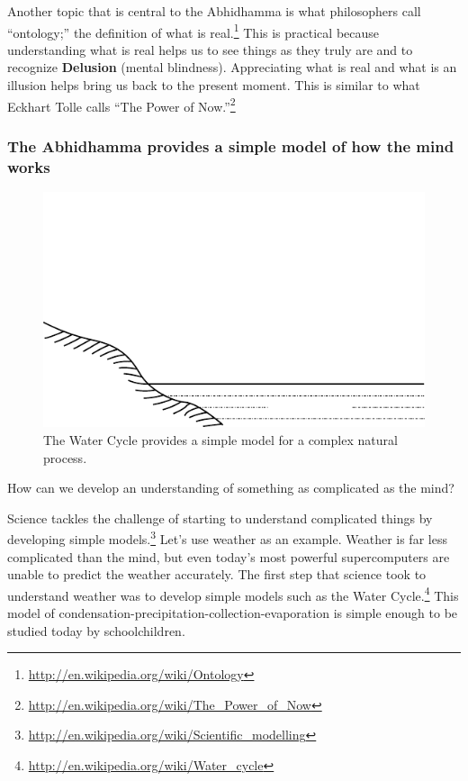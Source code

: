 Another topic that is central to the Abhidhamma is what philosophers call “ontology;” the definition of what is real.\footnote{\url{http://en.wikipedia.org/wiki/Ontology}} This is practical because understanding what is real helps us to see things as they truly are and to recognize \textbf{Delusion} (mental blindness). Appreciating what is real and what is an illusion helps bring us back to the present moment. This is similar to what Eckhart Tolle calls “The Power of Now.”\footnote{\url{http://en.wikipedia.org/wiki/The_Power_of_Now}}

\subsubsection*{The Abhidhamma provides a simple model of how the mind works}

\begin{figure}[H]
\centering
\includegraphics[width=1\linewidth]{./Diagrams/Rain}
\caption{The Water Cycle provides a simple model for a complex natural process.}
\label{fig:Rain}
\end{figure}

How can we develop an understanding of something as complicated as the mind? 

Science tackles the challenge of starting to understand complicated things by developing simple models.\footnote{\url{http://en.wikipedia.org/wiki/Scientific_modelling}} Let’s use weather as an example. Weather is far less complicated than the mind, but even today’s most powerful supercomputers are unable to predict the weather accurately. The first step that science took to understand weather was to develop simple models such as the Water Cycle.\footnote{\url{http://en.wikipedia.org/wiki/Water_cycle}} This model of condensation-precipitation-collection-evaporation is simple enough to be studied today by schoolchildren.

